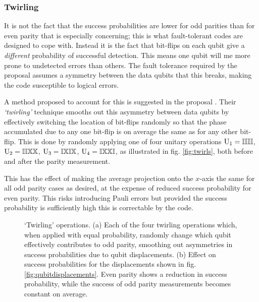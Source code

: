 
\subsubsection{Twirling}

It is not the fact that the success probabilities are lower for odd parities than for even parity that is especially concerning; this is what fault-tolerant codes are designed to cope with. Instead it is the fact that bit-flips on each qubit give a \emph{different} probability of successful detection. This means one qubit will me more prone to undetected errors than others. The fault tolerance required by the proposal assumes a symmetry between the data qubits that this breaks, making the code susceptible to logical errors.

A method proposed to account for this is suggested in the proposal \cite{OGorman2016}. Their \emph{`twirling'} technique smooths out this asymmetry between data qubits by effectively switching the location of bit-flips randomly so that the phase accumulated due to any one bit-flip is on average the same as for any other bit-flip. This is done by randomly applying one of four unitary operations $\mathrm{U_1 = \mathbb{I}\mathbb{I}\mathbb{I}\mathbb{I}}$, $\mathrm{U_2 = \mathbb{I}\mathbb{I}\mathbb{X}\mathbb{X}}$, $\mathrm{U_3 = \mathbb{I}\mathbb{X}\mathbb{I}\mathbb{X}}$, $\mathrm{U_4 = \mathbb{I}\mathbb{X}\mathbb{X}\mathbb{I}}$, as illustrated in fig. \ref{fig:twirls}, both before and after the parity measurement.

This has the effect of making the average projection onto the $x$-axis the same for all odd parity cases as desired, at the expense of reduced success probability for even parity. This risks introducing Pauli errors \cite{OGorman2016} but provided the success probability is sufficiently high this is correctable by the code.


\begin{figure}
	\centering
	\hspace{0.05\columnwidth}
	\caption{`Twirling' operations. (a) Each of the four twirling operations which, when applied with equal probability, randomly change which qubit effectively contributes to odd parity, smoothing out asymmetries in success probabilities due to qubit displacements. (b) Effect on success probabilities for the displacements shown in fig.\@ \ref{fig:qubitdisplacements}. Even parity shows a reduction in success probability, while the success of odd parity measurements becomes constant on average.}
\end{figure}